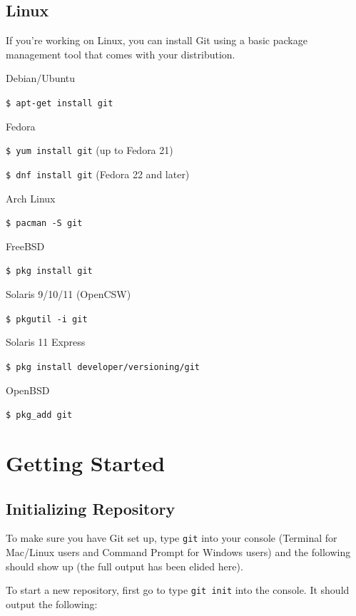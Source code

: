 \documentclass[12pt]{report}
\newcommand\code[1]{{\color{blue}\texttt{#1}}}
\begin{document}
\section{Linux}

If you're working on Linux, you can install Git using a basic package management tool that comes with your distribution.

Debian/Ubuntu

\code{\$ apt-get install git}

\bigskip

Fedora

\code{\$ yum install git} (up to Fedora 21)

\code{\$ dnf install git} (Fedora 22 and later)

\bigskip

Arch Linux

\code{\$ pacman -S git}

\bigskip

FreeBSD

\code{\$ pkg install git}

\bigskip

Solaris 9/10/11 (OpenCSW)

\code{\$ pkgutil -i git}

\bigskip

Solaris 11 Express

\code{\$ pkg install developer/versioning/git}

\bigskip

OpenBSD

\code{\$ pkg\_add git}


\chapter{Getting Started}
\section{Initializing Repository}

To make sure you have Git set up, type \code{git} into your console (Terminal for Mac/Linux users and Command Prompt for Windows users) and the following should show up (the full output has been elided here).

\bigskip
\noindent
To start a new repository, first go to type \code{git init} into the console. It should output the following:
\end{document}
